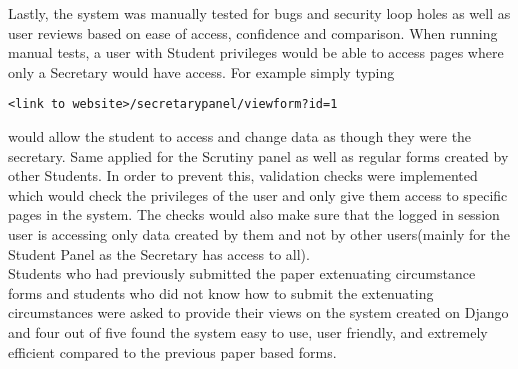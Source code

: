 \documentclass[../main.tex]{subfiles}
\begin{document}
Lastly, the system was manually tested for bugs and security loop holes as well as user reviews based on ease of access, confidence and comparison.
When running manual tests, a user with Student privileges would be able to access pages where only a Secretary would have access. For example simply typing 
\begin{verbatim}
<link to website>/secretarypanel/viewform?id=1
\end{verbatim} 
would allow the student to access and change data as though they were the secretary. Same applied for the Scrutiny panel as well as regular forms created by other Students. In order to prevent this, validation checks were implemented which would check the privileges of the user and only give them access to specific pages in the system. The checks would also make sure that the logged in session user is accessing only data created by them and not by other users(mainly for the Student Panel as the Secretary has access to all). \\
Students who had previously submitted the paper extenuating circumstance forms and students who did not know how to submit the extenuating circumstances were asked to provide their views on the system created on Django and four out of five found the system easy to use, user friendly, and extremely efficient compared to the previous paper based forms. 
\end{document}
